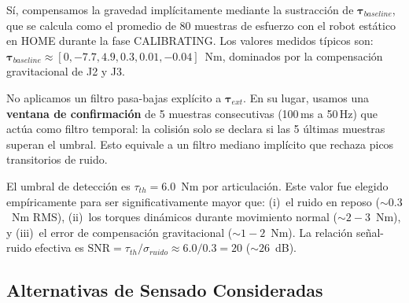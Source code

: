 \documentclass[journal,10pt,twoside]{IEEEtran}
\begin{document}
Sí, compensamos la gravedad implícitamente mediante la
sustracción de $\bm{\tau}_{baseline}$, que se calcula como el promedio
de 80 muestras de esfuerzo con el robot estático en HOME durante la
fase CALIBRATING. Los valores medidos típicos son:
$\bm{\tau}_{baseline}\approx[0, -7{.}7, 4{.}9, 0{.}3, 0{.}01, -0{.}04]$~Nm,
dominados por la compensación gravitacional de J2 y J3.

No aplicamos un filtro pasa-bajas explícito a
$\bm{\tau}_{ext}$. En su lugar, usamos una \textbf{ventana de
confirmación} de 5 muestras consecutivas (100\,ms a 50\,Hz) que actúa
como filtro temporal: la colisión solo se declara si las 5 últimas
muestras superan el umbral. Esto equivale a un filtro mediano
implícito que rechaza picos transitorios de ruido.

El umbral de detección es
$\tau_{th}=6{.}0$~Nm por articulación. Este valor fue elegido
empíricamente para ser significativamente mayor que:
(i)~el ruido en reposo ($\sim0{.}3$~Nm RMS),
(ii)~los torques dinámicos durante movimiento normal ($\sim2{-}3$~Nm), y
(iii)~el error de compensación gravitacional ($\sim1{-}2$~Nm).
La relación señal-ruido efectiva es
$\text{SNR}=\tau_{th}/\sigma_{ruido}\approx 6{.}0/0{.}3=20$ ($\sim26$~dB).

\subsection{Alternativas de Sensado Consideradas}

\smallskip
{}
\smallskip
\end{document}
